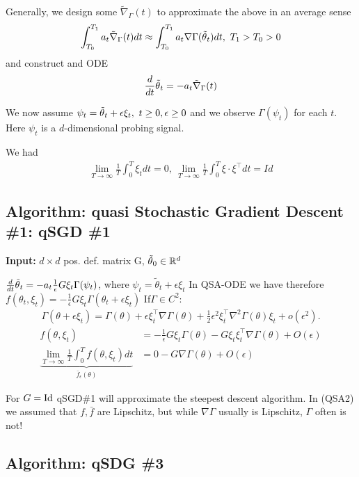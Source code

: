 Generally, we design some \(\tilde{\nabla}_\Gamma(t)\) to approximate the above in an average sense
\[\int_{T_0}^{T_1}a_t\tilde{\nabla}_\Gamma(t)dt \approx \int_{T_0}^{T_1}a_t \nabla\Gamma(\thetatilde_t)dt,\ T_1>T_0>0\]
and construct and ODE 
\begin{equation}
    \frac{d}{dt}{\tilde{\theta}}_t=-a_t\tilde{\nabla}_\Gamma(t)
\end{equation}

We now assume \(\psi_t={\tilde{\theta}}_t+\epsilon \xi_t,\ t\geq 0,\epsilon\geq 0\)
and we observe \(\Gamma(\psi_t)\) for each \(t\). Here \(\psi_t\) is a \(d\)-dimensional probing signal.

We had \begin{align*}
    \lim_{T\to\infty}\frac{1}{T}\int_0^T \xi_t dt=0,\ \lim_{T\to\infty}\frac{1}{T}\int_0^T \xi\cdot \xi^\intercal dt=Id
\end{align*}

\subsection{Algorithm: quasi Stochastic Gradient Descent \#1: qSGD \#1}

\textbf{Input:} \(d\times d\) pos. def. matrix G, \({\tilde{\theta}}_0\in \mathbb{R}^d\)

\(\frac{d}{dt}{\tilde{\theta}}_t=-a_t\frac{1}{\epsilon}G\xi_t\Gamma(\psi_t)\), where \(\psi_t=\tilde{\theta}_t+\epsilon\xi_t\)
In QSA-ODE 
we have therefore \(f(\theta_t,\xi_t)=-\frac{1}{\epsilon}G\xi_t\Gamma(\theta_t+\epsilon\xi_t)\)
If\(\Gamma\in C^2\):
\begin{align*}
    \Gamma(\theta+\epsilon\xi_t)=\Gamma(\theta)+\epsilon\xi_t^\intercal \nabla\Gamma(\theta)+\frac{1}{2}\epsilon^2\xi_t^\intercal\nabla^2 \Gamma(\theta)\xi_t+o(\epsilon^2).
\end{align*}
\begin{align*}
    f(\theta,\xi_t)&=-\frac{1}{\epsilon}G\xi_t\Gamma(\theta)-G \xi_t\xi_t^\intercal\nabla\Gamma(\theta)+O(\epsilon)\\
    \underbrace{\lim_{T\to\infty}\frac{1}{T}\int_0^Tf(\theta,\xi_t)dt}_{\bar{f}_\epsilon(\theta)}&=0-G\nabla\Gamma(\theta)+O(\epsilon) 
\end{align*}

For \(G=\text{Id}\) qSGD\#1 will approximate the steepest descent algorithm. In (QSA2) we assumed that 
\(f, \bar{f}\) are Lipschitz, but while \(\nabla\Gamma\) usually is Lipschitz, \(\Gamma\) often is not!

\subsection{Algorithm: qSDG \#3}

